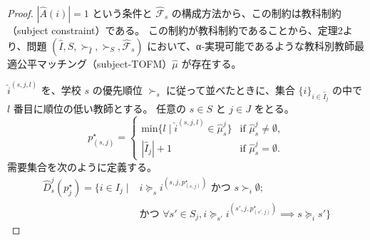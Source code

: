 \documentclass[12pt, a4paper]{article}
\theoremstyle{definition}
\theoremstyle{remark}
\theoremstyle{plain}
\begin{document}
\begin{proof}


$|\widehat{A}(i)| = 1$ という条件と $\widehat{\mathcal{F}}_s$ の構成方法から、この制約は教科制約（subject constraint）である。
この制約が教科制約であることから、定理2より、問題 $(\widehat{I},S,\succ_{\widehat{I}},\succ_S,\widehat{\mathcal{F}}_s)$ において、α-実現可能であるような教科別教師最適公平マッチング（subject-TOFM）$\widehat{\mu}$ が存在する。

$\widehat{i}^{(s,j,l)}$ を、学校 $s$ の優先順位 $\succ_s$ に従って並べたときに、集合 $\{i\}_{i \in \widehat{I}_j}$ の中で $l$ 番目に順位の低い教師とする。
任意の $s \in S$ と $j \in J$ をとる。
\[
p_{(s,j)}^\star =
\begin{cases}
\text{min} \{l \mid \widehat{i}^{(s,j,l)} \in \widehat{\mu}_s^j \} & \text{if } \widehat{\mu}_s^j \neq \emptyset, \\
|\widehat{I}_j| + 1      & \text{if } \widehat{\mu}_s^j = \emptyset.
\end{cases}
\]
需要集合を次のように定義する。
\begin{align*}
\widehat{D}^j_s(p^\star_j) = \{ i \in I_j \mid & i \succeq_s i^{(s,j,p^\star_{(s,j)})} \text{ かつ } s \succ_i \emptyset; \\
& \text{かつ } \forall s' \in S_j, i \succeq_{s'} i^{(s',j,p^\star_{(s',j)})} \implies s \succeq_i s' \}
\end{align*}




\end{proof}
\end{document}
